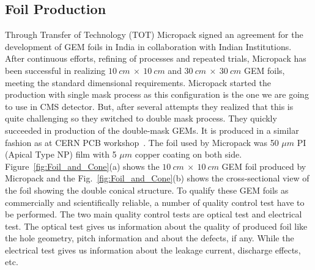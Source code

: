 \subsection{Foil Production}
Through Transfer of Technology (TOT) Micropack signed an agreement for the development of GEM foils in India in collaboration with Indian Institutions. 
After continuous efforts, refining of processes and repeated trials, Micropack has been successful in realizing $10~cm~\times~10~cm$ and $30~cm~\times~30~cm$ GEM foils, meeting the standard dimensional requirements.
Micropack started the production with single mask process as this configuration is the one we are going to use in CMS detector.
But, after several attempts they realized that this is quite challenging so they switched to double mask process. They quickly succeeded in production of the double-mask GEMs.
It is produced in a similar fashion as at CERN PCB workshop~\cite{DEOLIVEIRA2009}.
The foil used by Micropack was 50 $\mu m$ PI (Apical Type NP) film with 5 $\mu m$ copper coating on both side. Figure~\ref{fig:Foil_and_Cone}(a) shows the $10~cm~\times~10~cm$ GEM foil produced by Micropack and the Fig.~\ref{fig:Foil_and_Cone}(b) shows the cross-sectional view of the foil showing the double conical structure.
To qualify these GEM foils as commercially and scientifically reliable, a number of quality control test have to be performed. 
The two main quality control tests are optical test and electrical test. The optical test gives us information about the quality of produced foil like the hole geometry, pitch information and about the defects, if any. 
While the electrical test gives us information about the leakage current, discharge effects, etc.
